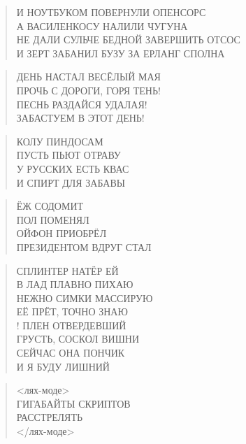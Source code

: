 \poemtitle{***}
\begin{verse}
И НОУТБУКОМ ПОВЕРНУЛИ ОПЕНСОРС\\
А ВАСИЛЕНКОСУ НАЛИЛИ ЧУГУНА\\
НЕ ДАЛИ СУЛЬЧЕ БЕДНОЙ ЗАВЕРШИТЬ ОТСОС\\
И ЗЕРТ ЗАБАНИЛ БУЗУ ЗА ЕРЛАНГ СПОЛНА
\end{verse}

\poemtitle{***}
\begin{verse}
ДЕНЬ НАСТАЛ ВЕСЁЛЫЙ МАЯ\\
ПРОЧЬ С ДОРОГИ, ГОРЯ ТЕНЬ!\\
ПЕСНЬ РАЗДАЙСЯ УДАЛАЯ!\\
ЗАБАСТУЕМ В ЭТОТ ДЕНЬ!
\end{verse}

\poemtitle{***}
\begin{verse}
КОЛУ ПИНДОСАМ\\
ПУСТЬ ПЬЮТ ОТРАВУ\\
У РУССКИХ ЕСТЬ КВАС\\
И СПИРТ ДЛЯ ЗАБАВЫ
\end{verse}

\poemtitle{***}
\begin{verse}
ЁЖ СОДОМИТ\\
ПОЛ ПОМЕНЯЛ\\
ОЙФОН ПРИОБРЁЛ\\
ПРЕЗИДЕНТОМ ВДРУГ СТАЛ
\end{verse}

\poemtitle{***}
\begin{verse}
СПЛИНТЕР НАТЁР ЕЙ\\
В ЛАД ПЛАВНО ПИХАЮ\\
НЕЖНО СИМКИ МАССИРУЮ\\
ЕЁ ПРЁТ, ТОЧНО ЗНАЮ\\!
ПЛЕН ОТВЕРДЕВШИЙ\\
ГРУСТЬ, СОСКОЛ ВИШНИ\\
СЕЙЧАС ОНА ПОНЧИК\\
И Я БУДУ ЛИШНИЙ
\end{verse}

\poemtitle{***}
\begin{verse}
<лях-моде>\\
ГИГАБАЙТЫ СКРИПТОВ\\
РАССТРЕЛЯТЬ\\
</лях-моде>
\end{verse}

